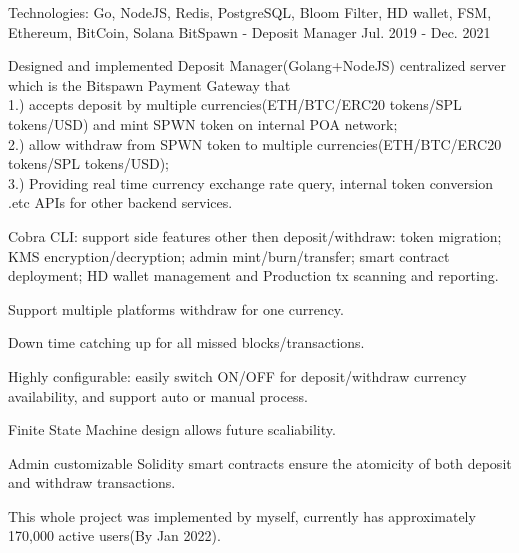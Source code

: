 \begin{cventries}
\cventry
    {Technologies: \quad Go, NodeJS, Redis, PostgreSQL, Bloom Filter, HD wallet, FSM, Ethereum, BitCoin, Solana}
    {BitSpawn - Deposit Manager}
    {}
    {Jul. 2019 - Dec. 2021}
    {
      \begin{cvitems}
      \item {Designed and implemented Deposit Manager(Golang+NodeJS) centralized server which is the Bitspawn Payment Gateway that \\
      1.) accepts deposit by multiple currencies(ETH/BTC/ERC20 tokens/SPL tokens/USD) and mint SPWN token on internal POA network; \\
      2.) allow withdraw from SPWN token to multiple currencies(ETH/BTC/ERC20 tokens/SPL tokens/USD); \\
      3.) Providing real time currency exchange rate query, internal token conversion .etc APIs for other backend services.}
        \item {Cobra CLI: support side features other then deposit/withdraw: token migration; KMS encryption/decryption; admin mint/burn/transfer; smart contract deployment; HD wallet management and Production tx scanning and reporting.}
        \item {Support multiple platforms withdraw for one currency.}
        \item {Down time catching up for all missed blocks/transactions.}
        \item {Highly configurable: easily switch ON/OFF for deposit/withdraw currency availability, and support auto or manual process.}
        \item {Finite State Machine design allows future scaliability.}
        \item {Admin customizable Solidity smart contracts ensure the atomicity of both deposit and withdraw transactions.}  
        \item {This whole project was implemented by myself, currently has approximately 170,000 active users(By Jan 2022).}
      \end{cvitems}
    }


\end{cventries}
